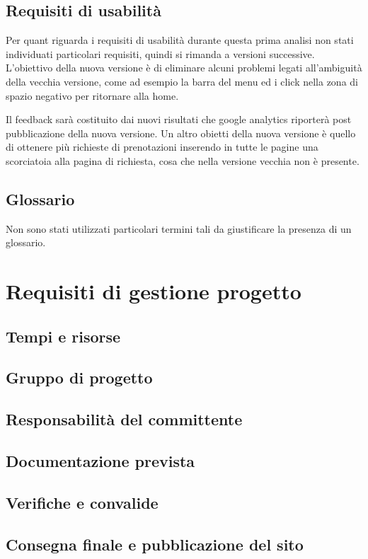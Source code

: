 \documentclass[a4paper,12pt,hidelinks]{report}
\begin{document}
\section{Requisiti di usabilità}
Per quant riguarda i requisiti di usabilità durante questa prima analisi non stati individuati particolari requisiti, quindi si rimanda a versioni successive. 
L'obiettivo della nuova versione è di eliminare alcuni problemi legati all'ambiguità della vecchia versione, come ad esempio la barra del menu ed i click nella zona di spazio
negativo per ritornare alla home. 
\par Il feedback sarà costituito dai nuovi risultati che google analytics riporterà post pubblicazione della nuova versione. Un altro obietti della nuova versione è quello di 
ottenere più richieste di prenotazioni inserendo in tutte le pagine una scorciatoia alla pagina di richiesta, cosa che nella versione vecchia non è presente.

\section{Glossario}
Non sono stati utilizzati particolari termini tali da giustificare la presenza di un glossario.


\chapter{Requisiti di gestione progetto}

\section{Tempi e risorse}
\section{Gruppo di progetto}
\section{Responsabilità del committente}
\section{Documentazione prevista}
\section{Verifiche e convalide}
\section{Consegna finale e pubblicazione del sito}
\end{document}
